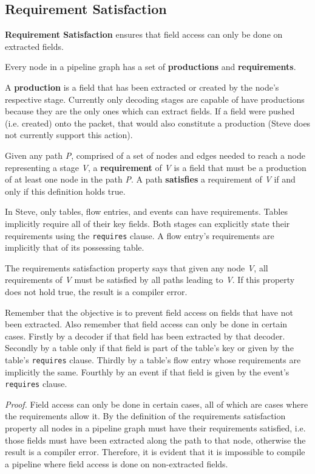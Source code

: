 \subsection{Requirement Satisfaction} \label{requirements_guide}

\textbf{Requirement Satisfaction} ensures that field access can only be done on extracted fields. 

Every node in a pipeline graph has a set of \textbf{productions} and \textbf{requirements}.

A \textbf{production} is a field that has been extracted or created by the node's respective stage. Currently only decoding stages are capable of have productions because they are the only ones which can extract fields. If a field were pushed (i.e. created) onto the packet, that would also constitute a production (Steve does not currently support this action).

Given any path \textit{P}, comprised of a set of nodes and edges needed to reach a node representing a stage \textit{V}, a \textbf{requirement} of \textit{V} is a field that must be a production of at least one node in the path \textit{P}. A path \textbf{satisfies} a requirement of \textit{V} if and only if this definition holds true.

In Steve, only tables, flow entries, and events can have requirements. Tables implicitly require all of their key fields. Both stages can explicitly state their requirements using the \texttt{\color{blue}requires} clause. A flow entry's requirements are implicitly that of its possessing table.

The requirements satisfaction property says that given any node \textit{V}, all requirements of \textit{V} must be satisfied by all paths leading to \textit{V}. If this property does not hold true, the result is a compiler error.

Remember that the objective is to prevent field access on fields that have not been extracted. Also remember that field access can only be done in certain cases. Firstly by a decoder if that field has been extracted by that decoder. Secondly by a table only if that field is part of the table's key or given by the table's \texttt{\color{blue}requires} clause. Thirdly by a table's flow entry whose requirements are implicitly the same. Fourthly by an event if that field is given by the event's \texttt{\color{blue}requires} clause.

\textit{Proof.} Field access can only be done in certain cases, all of which are cases where the requirements allow it. By the definition of the requirements satisfaction property all nodes in a pipeline graph must have their requirements satisfied, i.e. those fields must have been extracted along the path to that node, otherwise the result is a compiler error. Therefore, it is evident that it is impossible to compile a pipeline where field access is done on non-extracted fields.

